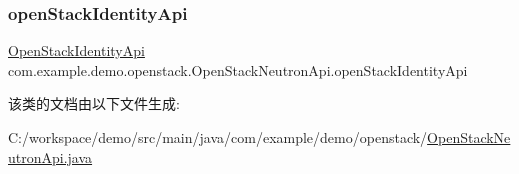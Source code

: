 \subsubsection{\texorpdfstring{open\+Stack\+Identity\+Api}{openStackIdentityApi}}
{\footnotesize\ttfamily \mbox{\hyperlink{classcom_1_1example_1_1demo_1_1openstack_1_1_open_stack_identity_api}{Open\+Stack\+Identity\+Api}} com.\+example.\+demo.\+openstack.\+Open\+Stack\+Neutron\+Api.\+open\+Stack\+Identity\+Api\hspace{0.3cm}{\ttfamily [private]}}



该类的文档由以下文件生成\+:\begin{DoxyCompactItemize}
\item 
C\+:/workspace/demo/src/main/java/com/example/demo/openstack/\mbox{\hyperlink{_open_stack_neutron_api_8java}{Open\+Stack\+Neutron\+Api.\+java}}\end{DoxyCompactItemize}
